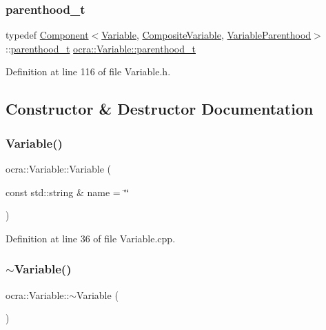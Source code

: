 \subsubsection{\texorpdfstring{parenthood\+\_\+t}{parenthood\_t}}
{\footnotesize\ttfamily typedef \hyperlink{classocra_1_1Component}{Component}$<$\hyperlink{classocra_1_1Variable}{Variable}, \hyperlink{classocra_1_1CompositeVariable}{Composite\+Variable}, \hyperlink{structocra_1_1VariableParenthood}{Variable\+Parenthood}$>$\+::\hyperlink{classocra_1_1Variable_a88444b2124cf5aab069f46734822f31f}{parenthood\+\_\+t} \hyperlink{classocra_1_1Variable_a88444b2124cf5aab069f46734822f31f}{ocra\+::\+Variable\+::parenthood\+\_\+t}}



Definition at line 116 of file Variable.\+h.



\subsection{Constructor \& Destructor Documentation}
\hypertarget{classocra_1_1Variable_a36123e9d1eb81555292618b62a549c49}{}\label{classocra_1_1Variable_a36123e9d1eb81555292618b62a549c49} 
\subsubsection{\texorpdfstring{Variable()}{Variable()}}
{\footnotesize\ttfamily ocra\+::\+Variable\+::\+Variable (\begin{DoxyParamCaption}\item[{const std\+::string \&}]{name = {\ttfamily \char`\"{}\char`\"{}} }\end{DoxyParamCaption})}



Definition at line 36 of file Variable.\+cpp.

\hypertarget{classocra_1_1Variable_a689b72889b26a7a5280f2d13686f0a16}{}\label{classocra_1_1Variable_a689b72889b26a7a5280f2d13686f0a16} 
\subsubsection{\texorpdfstring{$\sim$\+Variable()}{~Variable()}}
{\footnotesize\ttfamily ocra\+::\+Variable\+::$\sim$\+Variable (\begin{DoxyParamCaption}{ }\end{DoxyParamCaption})\hspace{0.3cm}{\ttfamily [pure virtual]}}



